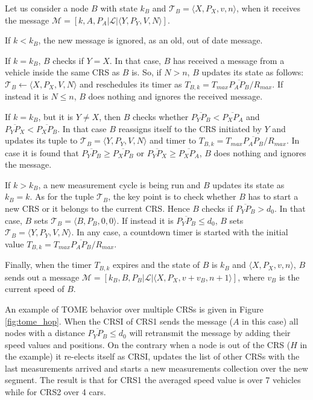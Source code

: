 \documentclass[conference]{IEEEtran}
\begin{document}
Let us consider a node $B$ with state $k_B$ and $\mathcal{T}_B = \langle X,P_X,v,n \rangle$, when it receives the message $\mathcal{M}=[k,A,P_A|\mathcal{L}|\langle Y,P_Y,V,N \rangle]$.

If $k < k_B$, the new message is ignored, as an old, out of date message.

If $k = k_B$, $B$ checks if $Y=X$. In that case, $B$ has received a message from a vehicle inside the same CRS as $B$ is. So, if $N>n$, $B$ updates its state as follows: $\mathcal{T}_B \leftarrow \langle X,P_X,V,N \rangle$ and reschedules its timer as $T_{B,k}=T_{max}\overline{P_AP_B}/R_{max}$. If instead it is $N \le n$, $B$ does nothing and ignores the received message.

If $k = k_B$, but it is $Y \ne X$, then $B$ checks whether $\overline{P_YP_B}<\overline{P_XP_A}$ and $\overline{P_YP_X}<\overline{P_XP_B}$. In that case $B$ reassigns itself to the CRS initiated by $Y$ and updates its tuple to  $\mathcal{T}_B=\langle Y,P_Y,V,N \rangle$ and timer to $T_{B,k}=T_{max}\overline{P_AP_B}/R_{max}$. In case it is found that $\overline{P_YP_B} \ge \overline{P_XP_B}$ or $\overline{P_YP_X} \ge \overline{P_XP_A}$, $B$ does nothing and ignores the message.

If $k > k_B$, a new measurement cycle is being run and $B$ updates its state as $k_B=k$. As for the tuple $\mathcal{T}_B$, the key point is to check whether $B$ has to start a new CRS or it belongs to the current CRS. Hence $B$ checks if $\overline{P_YP_B} > d_0$. In that case, $B$ sets $\mathcal{T}_B=\langle B,P_B,0,0 \rangle$. If instead it is $\overline{P_YP_B} \le d_0$, $B$ sets $\mathcal{T}_B=\langle Y,P_Y,V,N \rangle$. In any case, a countdown timer is started with the initial value $T_{B,k}=T_{max}\overline{P_AP_B}/R_{max}$.

Finally, when the timer $T_{B,k}$ expires and the state of $B$ is $k_B$ and $\langle X,P_X,v,n \rangle$, $B$ sends out a message $\mathcal{M}=[ k_B,B,P_B|\mathcal{L}|\langle X,P_X,v+v_B,n+1 \rangle ]$, where $v_B$ is the current speed of $B$.

An example of TOME behavior over multiple CRSs is given in Figure \ref{fig:tome_hop}. When the CRSI of CRS1 sends the message ($A$ in this case) all nodes with a distance $\overline{P_YP_B} \le d_0$ will retransmit the message by adding their speed values and positions. On the contrary when a node is out of the CRS ($H$ in the example) it re-elects itself as CRSI, updates the list of other CRSs with the last measurements arrived and starts a new measurements collection over the new segment. The result is that for CRS1 the averaged speed value is over 7 vehicles while for CRS2 over 4 cars.
\end{document}
